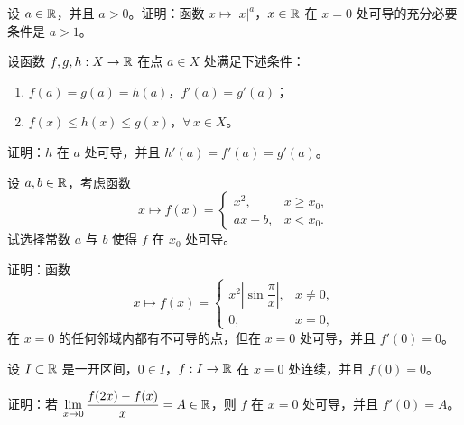 \begin{exercise}
	\item 设 \(a\in\mathbb{R}\)，并且 \(a>0\)。证明：函数 \(x\longmapsto|x|^a\)，\(x\in\mathbb{R}\) 在 \(x=0\) 处可导的充分必要条件是 \(a>1\)。
\end{exercise}

\begin{exercise}
	\item 设函数 \(f,g,h:X\to\mathbb{R}\) 在点 \(a\in X\) 处满足下述条件：
	\begin{enumerate}[label=\arabic*)]
		\item \(f(a)=g(a)=h(a)\)，\(f'(a)=g'(a)\)；
		\item \(f(x)\le h(x)\le g(x)\)，\(\forall\,x\in X\)。
	\end{enumerate}
	证明：\(h\) 在 \(a\) 处可导，并且 \(h'(a)=f'(a)=g'(a)\)。
\end{exercise}

\begin{exercise}
	\item 设 \(a,b\in\mathbb{R}\)，考虑函数
	\[
	x\longmapsto f(x)=\begin{cases} x^2, & x\ge x_0, \\ ax+b, & x<x_0. \end{cases}
	\]
	试选择常数 \(a\) 与 \(b\) 使得 \(f\) 在 \(x_0\) 处可导。
\end{exercise}

\begin{exercise}
	\item 证明：函数
	\[
	x\longmapsto f(x)=\begin{cases} x^2\left|\sin\dfrac\pi x\right|, & x\neq0, \\ 0, & x=0, \end{cases}
	\]
	在 \(x=0\) 的任何邻域内都有不可导的点，但在 \(x=0\) 处可导，并且 \(f'(0)=0\)。
\end{exercise}

\begin{exercise}
	\item 设 \(I\subset\mathbb{R}\) 是一开区间，\(0\in I\)，\(f:I\to\mathbb{R}\) 在 \(x=0\) 处连续，并且 \(f(0)=0\)。

	证明：若 \(\displaystyle\lim_{x\to0}\frac{f(2x)-f(x)}x=A\in\mathbb{R}\)，则 \(f\) 在 \(x=0\) 处可导，并且 \(f'(0)=A\)。
\end{exercise}

